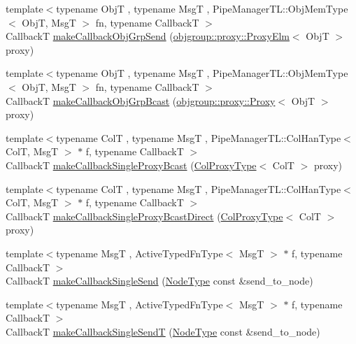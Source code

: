 \begin{DoxyCompactItemize}
\item 
{\footnotesize template$<$typename ObjT , typename MsgT , Pipe\+Manager\+T\+L\+::\+Obj\+Mem\+Type$<$ Obj\+T, Msg\+T $>$ fn, typename CallbackT $>$ }\\CallbackT \hyperlink{structvt_1_1pipe_1_1_pipe_manager_t_l_a304681fe59bec2e1ad28a357f48aeab3}{make\+Callback\+Obj\+Grp\+Send} (\hyperlink{structvt_1_1objgroup_1_1proxy_1_1_proxy_elm}{objgroup\+::proxy\+::\+Proxy\+Elm}$<$ ObjT $>$ proxy)
\item 
{\footnotesize template$<$typename ObjT , typename MsgT , Pipe\+Manager\+T\+L\+::\+Obj\+Mem\+Type$<$ Obj\+T, Msg\+T $>$ fn, typename CallbackT $>$ }\\CallbackT \hyperlink{structvt_1_1pipe_1_1_pipe_manager_t_l_a9caf63b8c6577acd4884933c1b9cc886}{make\+Callback\+Obj\+Grp\+Bcast} (\hyperlink{structvt_1_1objgroup_1_1proxy_1_1_proxy}{objgroup\+::proxy\+::\+Proxy}$<$ ObjT $>$ proxy)
\item 
{\footnotesize template$<$typename ColT , typename MsgT , Pipe\+Manager\+T\+L\+::\+Col\+Han\+Type$<$ Col\+T, Msg\+T $>$ $\ast$ f, typename CallbackT $>$ }\\CallbackT \hyperlink{structvt_1_1pipe_1_1_pipe_manager_t_l_aff5140772699150c68dc912017e3a670}{make\+Callback\+Single\+Proxy\+Bcast} (\hyperlink{structvt_1_1pipe_1_1_pipe_manager_t_l_af56c58cad882496e35f01227d4da3898}{Col\+Proxy\+Type}$<$ ColT $>$ proxy)
\item 
{\footnotesize template$<$typename ColT , typename MsgT , Pipe\+Manager\+T\+L\+::\+Col\+Han\+Type$<$ Col\+T, Msg\+T $>$ $\ast$ f, typename CallbackT $>$ }\\CallbackT \hyperlink{structvt_1_1pipe_1_1_pipe_manager_t_l_a41fec001a4e698cb2bac888a6a48d606}{make\+Callback\+Single\+Proxy\+Bcast\+Direct} (\hyperlink{structvt_1_1pipe_1_1_pipe_manager_t_l_af56c58cad882496e35f01227d4da3898}{Col\+Proxy\+Type}$<$ ColT $>$ proxy)
\item 
{\footnotesize template$<$typename MsgT , Active\+Typed\+Fn\+Type$<$ Msg\+T $>$ $\ast$ f, typename CallbackT $>$ }\\CallbackT \hyperlink{structvt_1_1pipe_1_1_pipe_manager_t_l_ab160500f39018d96e56743095a1869e8}{make\+Callback\+Single\+Send} (\hyperlink{namespacevt_a866da9d0efc19c0a1ce79e9e492f47e2}{Node\+Type} const \&send\+\_\+to\+\_\+node)
\item 
{\footnotesize template$<$typename MsgT , Active\+Typed\+Fn\+Type$<$ Msg\+T $>$ $\ast$ f, typename CallbackT $>$ }\\CallbackT \hyperlink{structvt_1_1pipe_1_1_pipe_manager_t_l_ac4d276c82d9f04628263ffd07841fdcf}{make\+Callback\+Single\+SendT} (\hyperlink{namespacevt_a866da9d0efc19c0a1ce79e9e492f47e2}{Node\+Type} const \&send\+\_\+to\+\_\+node)

\end{DoxyCompactItemize}
